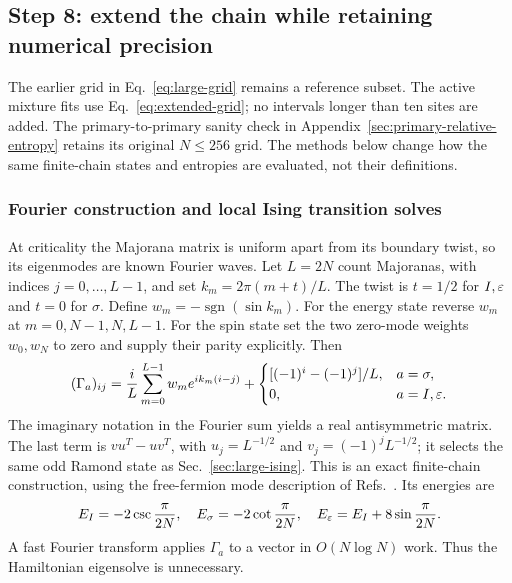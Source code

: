 \subsection{Step 8: extend the chain while retaining numerical precision}
\label{sec:extended-production}

The earlier grid in Eq.~\eqref{eq:large-grid} remains a reference subset.
The active mixture fits use Eq.~\eqref{eq:extended-grid}; no intervals
longer than ten sites are added. The primary-to-primary sanity check
in Appendix~\ref{sec:primary-relative-entropy} retains its original
$N\leq256$ grid. The methods below change how the same finite-chain
states and entropies are evaluated, not their definitions.

\subsubsection{Fourier construction and local Ising transition solves}
At criticality the Majorana matrix is uniform apart from its boundary
twist, so its eigenmodes are known Fourier waves. Let $L=2N$ count
Majoranas, with indices $j=0,\ldots,L-1$, and set
$k_m=2\pi(m+t)/L$. The twist is $t=1/2$ for $I,\varepsilon$ and $t=0$
for $\sigma$. Define $w_m=-\operatorname{sgn}(\sin k_m)$.
For the energy state reverse $w_m$ at $m=0,N-1,N,L-1$.
For the spin state set the two zero-mode weights $w_0,w_N$ to zero
and supply their parity explicitly. Then
\begin{equation}
 (\Gamma_a)_{ij}=\frac{i}{L}\sum_{m=0}^{L-1}w_m
 e^{ik_m(i-j)}+\begin{cases}
 [(-1)^i-(-1)^j]/L,&a=\sigma,\\0,&a=I,\varepsilon.
 \end{cases}
 \label{eq:fourier-covariance}
\end{equation}
The imaginary notation in the Fourier sum yields a real antisymmetric
matrix. The last term is $vu^T-uv^T$, with $u_j=L^{-1/2}$ and
$v_j=(-1)^jL^{-1/2}$; it selects the same odd Ramond state as
Sec.~\ref{sec:large-ising}. This is an exact finite-chain construction,
using the free-fermion mode description of Refs.~\cite{Montes2017,PeschelEisler}.
Its energies are
\begin{equation}
 E_I=-2\csc\frac{\pi}{2N},\quad
 E_\sigma=-2\cot\frac{\pi}{2N},\quad
 E_\varepsilon=E_I+8\sin\frac{\pi}{2N}.
 \label{eq:fourier-energies}
\end{equation}
A fast Fourier transform applies $\Gamma_a$ to a vector in
$O(N\log N)$ work. Thus the Hamiltonian eigensolve is unnecessary.

